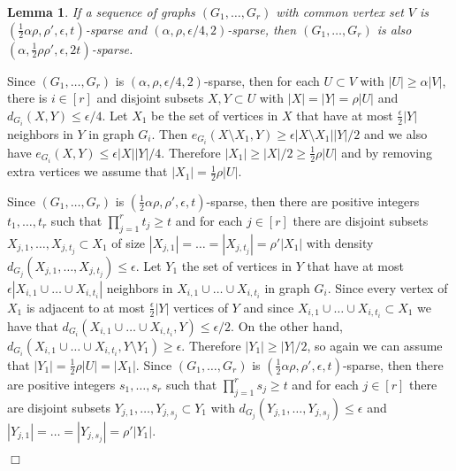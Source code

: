 \documentclass[11pt]{article}
\newenvironment{proof}
      {\medskip\noindent{\bf Proof.}\hspace{1mm}}
      {\hfill$\Box$\medskip}
\newtheorem{lemma}[theorem]{Lemma}
\begin{document}
\begin{lemma}
\label{l32}
If a sequence of graphs $(G_1,\ldots,G_r)$ with common vertex set $V$ is
$(\frac{1}{2}\alpha\rho,\rho',\epsilon,t)$-sparse
and $(\alpha,\rho,\epsilon/4,2)$-sparse,
then $(G_1,\ldots,G_r)$ is also $(\alpha,\frac{1}{2}\rho\rho',\epsilon,2t)$-sparse.
\end{lemma}
\begin{proof}
Since $(G_1,\ldots,G_r)$ is $(\alpha,\rho,\epsilon/4,2)$-sparse,
then for each $U \subset V$ with $|U| \geq \alpha |V|$, there is $i
\in [r]$ and disjoint subsets $X,Y \subset U$ with $|X|=|Y| =
\rho|U|$ and $d_{G_{i}}(X,Y) \leq \epsilon/4$. Let $X_1$ be the set of vertices in
$X$ that have at most $\frac{\epsilon}{2}|Y|$ neighbors in $Y$ in graph $G_i$. Then
$e_{G_i}(X\setminus X_1,Y) \geq \epsilon|X\setminus X_1||Y|/2$ and we also have $e_{G_i}(X,Y) \leq \epsilon|X||Y|/4$.
Therefore $|X_1| \geq |X|/2 \geq \frac{1}{2}\rho|U|$ and by removing extra vertices we
assume that $|X_1|= \frac{1}{2}\rho|U|$.

Since $(G_1,\ldots,G_r)$ is
$(\frac{1}{2}\alpha\rho,\rho',\epsilon,t)$-sparse, then there are
positive integers $t_{1},\ldots,t_{r}$ such that $\prod_{j=1}^r
t_{j} \geq t$ and for each $j \in [r]$ there are disjoint subsets
$X_{j,1},\ldots,X_{j,t_j} \subset X_1$ of size
$|X_{j,1}|=\ldots=|X_{j,t_j}|=\rho' |X_1|$ with density
$d_{G_j}(X_{j,1},\ldots,X_{j,t_j})\leq \epsilon$. Let $Y_1$ the set
of vertices in $Y$ that have at most $\epsilon|X_{i,1} \cup \ldots
\cup X_{i,t_i}|$ neighbors in $X_{i,1} \cup \ldots \cup X_{i,t_i}$
in graph $G_i$. Since every vertex of $X_1$ is adjacent to at most
$\frac{\epsilon}{2}|Y|$ vertices of $Y$ and since $X_{i,1} \cup
\ldots \cup X_{i,t_i}\subset X_1$ we have that $d_{G_i}(X_{i,1} \cup
\ldots \cup X_{i,t_i},Y)\leq \epsilon/2$. On the other hand,
$d_{G_i}(X_{i,1} \cup \ldots \cup X_{i,t_i},Y\setminus Y_1)\geq
\epsilon$. Therefore $|Y_1|\geq |Y|/2$, so again we can assume that
$|Y_1|=\frac{1}{2}\rho|U|=|X_1|$. Since $(G_1,\ldots,G_r)$ is
$(\frac{1}{2}\alpha\rho,\rho',\epsilon,t)$-sparse, then there are
positive integers $s_{1},\ldots,s_{r}$ such that $\prod_{j=1}^r
s_{j} \geq t$ and for each $j \in [r]$ there are disjoint subsets
$Y_{j,1},\ldots,Y_{j,s_j} \subset Y_1$ with
$d_{G_j}(Y_{j,1},\ldots,Y_{j,s_j})\leq \epsilon$ and
$|Y_{j,1}|=\ldots=|Y_{j,s_j}|=\rho' |Y_1|$.



\end{proof}
\end{document}
